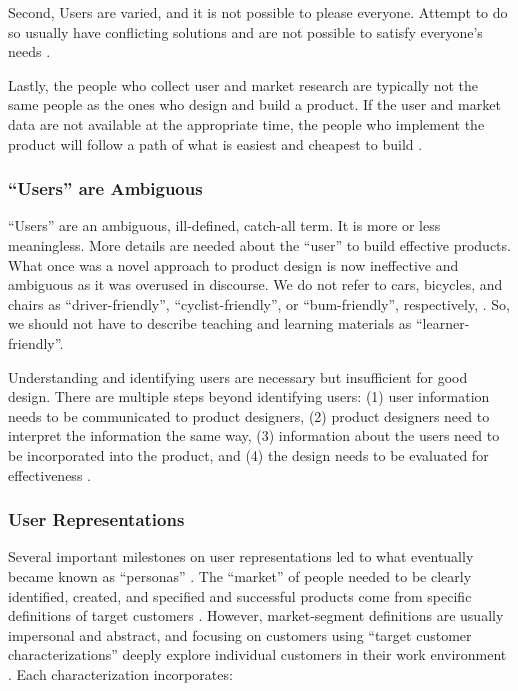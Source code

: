 \documentclass[010-intro.tex]{subfiles}
\begin{document}
        Second,
        Users are varied, and it is not possible to please everyone.
        Attempt to do so usually have conflicting solutions and are not possible to satisfy everyone's needs
        \cite{pruittPersonaLifecycleKeeping2006}.

        Lastly,
        the people who collect user and market research are typically not the same people as the ones who
        design and build a product.
        If the user and market data are not available at the appropriate time,
        the people who implement the product will follow a path of what is easiest and cheapest to build
        \cite{pruittPersonaLifecycleKeeping2006}.

    \subsubsection{``Users'' are Ambiguous}

        ``Users'' are an ambiguous, ill-defined, catch-all term.
        It is more or less meaningless.
        More details are needed about the ``user'' to build effective products.
        What once was a novel approach to product design is now ineffective and ambiguous as it was overused in discourse.
        We do not refer to cars, bicycles, and chairs as
        ``driver-friendly'',
        ``cyclist-friendly'', or
        ``bum-friendly'', respectively,
        \cite{pruittPersonaLifecycleKeeping2006}.
        So, we should not have to describe teaching and learning materials as ``learner-friendly''.

        Understanding and identifying users are necessary but insufficient for good design.
        There are multiple steps beyond identifying users:
        (1) user information needs to be communicated to product designers,
        (2) product designers need to interpret the information the same way,
        (3) information about the users need to be incorporated into the product, and
        (4) the design needs to be evaluated for effectiveness
        \cite{pruittPersonaLifecycleKeeping2006}.

    \subsubsection{User Representations}

        Several important milestones on user representations led to what eventually became known as ``personas''
        \cite{pruittPersonaLifecycleKeeping2006}.
        The ``market'' of people needed to be clearly identified, created, and specified and
        successful products come from specific definitions of target customers
        \cite{sissorsWhatMarket1966, winstonDefiningYourMarket1998, pruittPersonaLifecycleKeeping2006}.
        However, market-segment definitions are usually impersonal and abstract, and focusing on
        customers using ``target customer characterizations'' deeply explore individual customers in their work environment
        \cite{mooreCrossingChasmMarketing1991, pruittPersonaLifecycleKeeping2006}.
        Each characterization incorporates:
\end{document}
